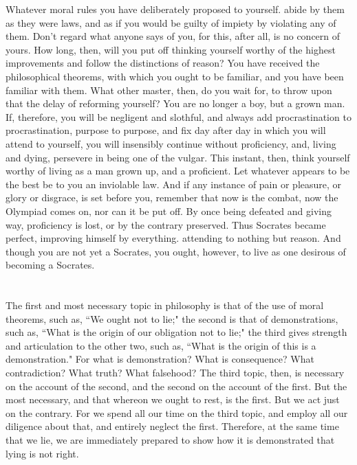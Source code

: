 \documentclass[12pt]{article}
\begin{document}
Whatever moral rules you have deliberately proposed to yourself.
abide by them as they were laws, and as if you would be guilty of
impiety by violating any of them. Don't regard what anyone says of
you, for this, after all, is no concern of yours. How long, then,
will you put off thinking yourself worthy of the highest improvements
and follow the distinctions of reason? You have received the philosophical
theorems, with which you ought to be familiar, and you have been familiar
with them. What other master, then, do you wait for, to throw upon
that the delay of reforming yourself? You are no longer a boy, but
a grown man. If, therefore, you will be negligent and slothful, and
always add procrastination to procrastination, purpose to purpose,
and fix day after day in which you will attend to yourself, you will
insensibly continue without proficiency, and, living and dying, persevere
in being one of the vulgar. This instant, then, think yourself worthy
of living as a man grown up, and a proficient. Let whatever appears
to be the best be to you an inviolable law. And if any instance of
pain or pleasure, or glory or disgrace, is set before you, remember
that now is the combat, now the Olympiad comes on, nor can it be put
off. By once being defeated and giving way, proficiency is lost, or
by the contrary preserved. Thus Socrates became perfect, improving
himself by everything. attending to nothing but reason. And though
you are not yet a Socrates, you ought, however, to live as one desirous
of becoming a Socrates. 

\section{}

The first and most necessary topic in philosophy is that of the
use of moral theorems, such as, ``We ought not to lie;" the second
is that of demonstrations, such as, ``What is the origin of our obligation
not to lie;" the third gives strength and articulation to the other
two, such as, ``What is the origin of this is a demonstration." For
what is demonstration? What is consequence? What contradiction? What
truth? What falsehood? The third topic, then, is necessary on the
account of the second, and the second on the account of the first.
But the most necessary, and that whereon we ought to rest, is the
first. But we act just on the contrary. For we spend all our time
on the third topic, and employ all our diligence about that, and entirely
neglect the first. Therefore, at the same time that we lie, we are
immediately prepared to show how it is demonstrated that lying is
not right. 
\end{document}
